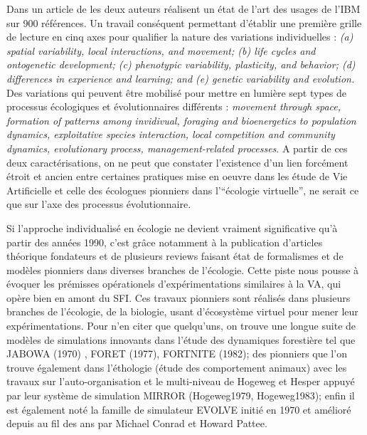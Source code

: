 Dans un article de \textcite{DeAngelis2005} les deux auteurs réalisent un état de l'art des usages de l'IBM sur 900 références. Un travail conséquent permettant d'établir une première grille de lecture en cinq axes pour qualifier la nature des variations individuelles : \textit{(a) spatial variability, local interactions, and movement; (b) life cycles and ontogenetic development; (c) phenotypic variability, plasticity, and behavior; (d) differences in experience and learning; and (e) genetic variability and evolution.} Des variations qui peuvent être mobilisé pour mettre en lumière sept types de processus écologiques et évolutionnaires différents : \textit{movement through space, formation of patterns among invidivual, foraging and bioenergetics to population dynamics, exploitative species interaction, local competition and community dynamics, evolutionary process, management-related processes}. A partir de ces deux caractérisations, on ne peut que constater l'existence d'un lien forcément étroit \autocite{Dorin2008} et ancien \autocites{Hogeweg1988, Hogeweg1990, DeAngelis2014} entre certaines pratiques mise en oeuvre dans les étude de Vie Artificielle et celle des écologues pionniers dans l'\enquote{écologie virtuelle}, ne serait ce que sur l'axe des processus évolutionnaire.

Si l'approche individualisé en écologie ne devient vraiment significative qu'à partir des années 1990, c'est grâce notamment à la publication d'articles théorique fondateurs \autocite{Huston1988} et de plusieurs reviews faisant état de formalismes \autocite{Hogeweg1988} et de modèles pionniers \autocites{Hogeweg1990, DeAngelis1992, Judson1994} dans diverses branches de l'écologie. Cette piste nous pousse à évoquer les prémisses opérationels d'expérimentations similaires à la VA, qui opère bien en amont du SFI. Ces travaux pionniers sont réalisés dans plusieurs branches de l'écologie, de la biologie, usant d'écosystème virtuel pour mener leur expérimentations. Pour n'en citer que quelqu'uns, on trouve une longue suite de modèles de simulations innovants dans l'étude des dynamiques forestière \autocite{Bugmann2001} tel que JABOWA (1970) \autocite{Botkin1972}, FORET (1977), FORTNITE (1982); des pionniers que l'on trouve également dans l'éthologie (étude des comportement animaux) avec les travaux sur l'auto-organisation et le multi-niveau de Hogeweg et Hesper appuyé par leur système de simulation MIRROR (Hogeweg1979, Hogeweg1983); enfin il est également noté la famille de simulateur EVOLVE initié en 1970 et amélioré depuis au fil des ans par Michael Conrad et Howard Pattee. \autocites{Conrad1970, Pattee2002}

